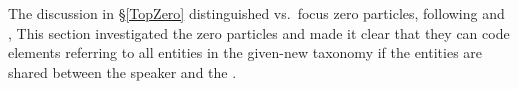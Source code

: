 The discussion in \S \ref{TopZero} distinguished  vs.~focus zero particles,
following  and ,
This section investigated the  zero particles and made it clear
that they can code elements referring to all entities in the given-new taxonomy
if the entities are shared between the speaker and the .


%
%
%
